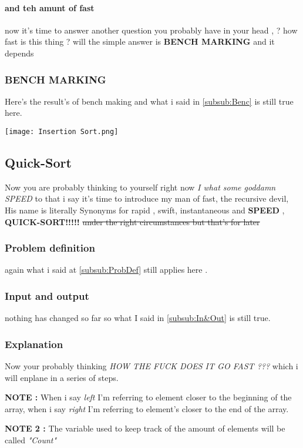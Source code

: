 \documentclass{article}
\begin{document}
\paragraph{and teh amunt of fast} now it's time to answer another question you probably have in your head , ? how fast is this thing ? will the simple answer is \textbf{BENCH MARKING} and it depends\\
\subsubsection{BENCH MARKING}
Here's the result's of bench making and what i said in \ref{subsub:Benc} is still true here.
\begin{center}
\texttt{[image: Insertion Sort.png]}
\end{center}
\subsection{Quick-Sort}
Now you are probably thinking to yourself right now \textit{I what some goddamn SPEED } to that i say it's time to introduce my man of fast, the recursive devil, His name is literally Synonyms for rapid , swift, instantaneous and \textbf{SPEED} , \textbf{QUICK-SORT!!!!!} \st{under the right circumstances but that's for later}\\
\subsubsection{Problem definition}
 again what i said at \autoref{subsub:ProbDef} still applies here .
 \subsubsection{Input and output}
nothing has changed so far so what I said in \autoref{subsub:In&Out} is still true.
\subsubsection{Explanation}
Now your probably thinking \textit{ HOW THE FUCK DOES IT GO FAST ??? } which i will enplane in a series of steps.

 
\textbf{NOTE :} When i say \textit{left} I'm referring to element closer to the beginning of the array, when i say \textit{right} I'm referring to element's closer to the end of the array.


\textbf{NOTE 2 :} The variable used to keep track of the amount of elements will be called \textit{"Count"}
\end{document}
